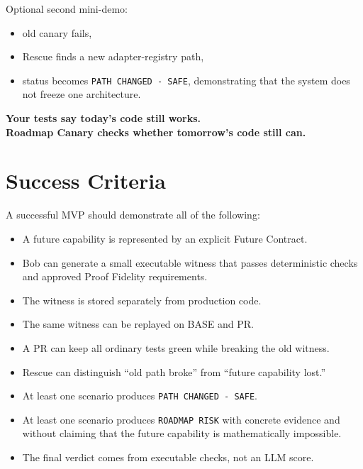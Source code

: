 \documentclass[12pt]{article}
\begin{document}
Optional second mini-demo:

\begin{itemize}
    \item old canary fails,
    \item Rescue finds a new adapter-registry path,
    \item status becomes \texttt{PATH CHANGED - SAFE}, demonstrating that the system does not freeze one architecture.
\end{itemize}

\begin{pitchbox}
\centering
\textbf{Your tests say today's code still works.}\\
\textbf{Roadmap Canary checks whether tomorrow's code still can.}
\end{pitchbox}

\section{Success Criteria}

A successful MVP should demonstrate all of the following:

\begin{itemize}
    \item A future capability is represented by an explicit Future Contract.
    \item Bob can generate a small executable witness that passes deterministic checks and approved Proof Fidelity requirements.
    \item The witness is stored separately from production code.
    \item The same witness can be replayed on BASE and PR.
    \item A PR can keep all ordinary tests green while breaking the old witness.
    \item Rescue can distinguish ``old path broke'' from ``future capability lost.''
    \item At least one scenario produces \texttt{PATH CHANGED - SAFE}.
    \item At least one scenario produces \texttt{ROADMAP RISK} with concrete evidence and without claiming that the future capability is mathematically impossible.
    \item The final verdict comes from executable checks, not an LLM score.
\end{itemize}

\end{document}
